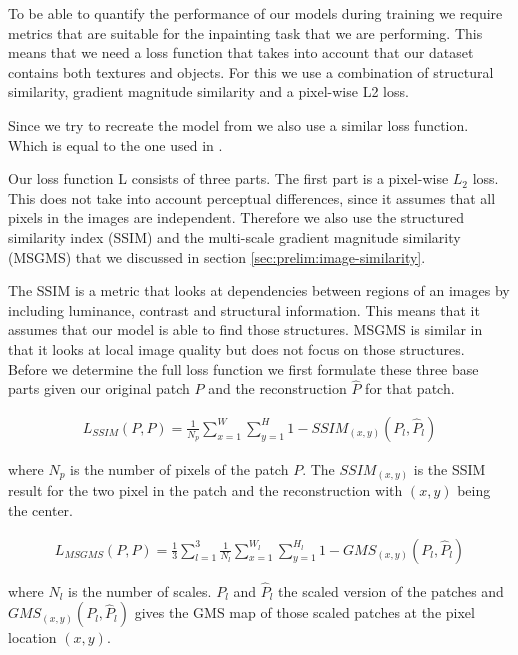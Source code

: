 To be able to quantify the performance of our models during training we require metrics that are suitable for the inpainting task that we are performing. This means that we need a loss function that takes into account that our dataset contains both textures and objects. For this we use a combination of structural similarity, gradient magnitude similarity and a pixel-wise L2 loss.

Since we try to recreate the model from \cite{pirnay_inpainting_2021} we also use a similar loss function. Which is equal to the one used in \cite{zavrtanik_reconstruction_2021}.

Our loss function L consists of three parts. The first part is a pixel-wise $L_2$ loss. This does not take into account perceptual differences, since it assumes that all pixels in the images are independent. Therefore we also use the structured similarity index (SSIM) \cite{wang_image_2004} and the multi-scale gradient magnitude similarity (MSGMS) \cite{xue_gradient_2014, zhang_gradient_2017} that we discussed in section \ref{sec:prelim:image-similarity}.

The SSIM is a metric that looks at dependencies between regions of an images by including luminance, contrast and structural information. This means that it assumes that our model is able to find those structures. MSGMS is similar in that it looks at local image quality but does not focus on those structures.
\\
Before we determine the full loss function we first formulate these three base parts given our original patch $P$ and the reconstruction $\hat{P}$ for that patch.

\begin{align}
L_{SSIM}(P, P) = \frac{1}{N_p} \sum_{x=1}^{W}\sum_{y=1}^{H}{} {1 - SSIM_{(x,y)}(P_l, \hat{P}_l)}
\end{align}

where $N_p$ is the number of pixels of the patch $P$. The $SSIM_(x,y)$ is the SSIM result for the two pixel in the patch and the reconstruction with $(x,y)$ being the center.

\begin{align}
L_{MSGMS}(P, P) = \frac{1}{3} \sum_{l=1}^{3} \frac{1}{N_l} \sum_{x=1}^{W_l}\sum_{y=1}^{H_l}{} {1 - GMS_{(x,y)}(P_l, \hat{P}_l)}
\end{align}

where $N_l$ is the number of scales. $P_l$ and $\hat{P}_l$ the scaled version of the patches and $GMS_{(x,y)}(P_l, \hat{P}_l)$ gives the GMS map of those scaled patches at the pixel location $(x,y)$.


